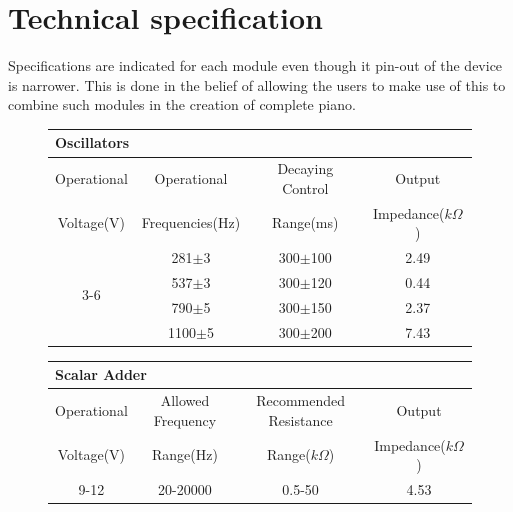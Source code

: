 \documentclass[a4paper,12pt,oneside,pdflatex,italian,final,twocolumn]{article}
\begin{document}
\section{Technical specification}
Specifications are indicated for each module even though it pin-out of the device is narrower. This is done in the belief of allowing the users to make use of this to combine such modules in the creation of complete piano.\\
\vspace{-.5cm}
\begin{figure}[h]
\begin{minipage}{\textwidth}
\begin{center}
\begin{tabular}{|c|c|c|c|}
     \multicolumn{4}{l}{\textbf{Oscillators}}\\
    \toprule
     Operational  & Operational  & Decaying Control  & Output \\
     Voltage(V) & Frequencies(Hz)& Range(ms) & Impedance($k\Omega$)\\
    \midrule
   \multirow{4}{*}{3-6} & 281$\pm$3 & 300$\pm$100 & 2.49 \\
     & 537$\pm$3 & 300$\pm$120 & 0.44 \\
     & 790$\pm$5 & 300$\pm$150 & 2.37 \\
     & 1100$\pm$5 & 300$\pm$200 & 7.43 \\
    \bottomrule
\end{tabular}
\end{center}
\end{minipage}

\begin{minipage}{\textwidth}
\vspace{.8cm}
\begin{center}
    \begin{tabular}{|c|c|c|c|}
     \multicolumn{4}{l}{\textbf{Scalar Adder}}\\
    \toprule
     Operational  & Allowed Frequency & Recommended Resistance  & Output \\
     Voltage(V) & Range(Hz) & Range($k\Omega$) & Impedance($k\Omega$)\\
    \midrule
    9-12 & 20-20000 & 0.5-50 & 4.53\\
    \bottomrule
\end{tabular}
\end{center}
\end{minipage}


\end{figure}
\end{document}
